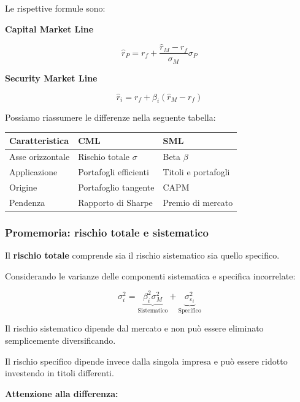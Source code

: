 \noindent Le rispettive formule sono:

\medskip

\noindent \textbf{Capital Market Line}

\[
\boxed{
\hat{r}_P=
r_f+\frac{\hat{r}_M-r_f}{\sigma_M}\sigma_P
}
\]

\noindent \textbf{Security Market Line}

\[
\boxed{
\hat{r}_i=
r_f+\beta_i(\hat{r}_M-r_f)
}
\]

\noindent Possiamo riassumere le differenze
nella seguente tabella:

\begin{center}
\small
\begin{tabular}{|l|l|l|}
\hline
\textbf{Caratteristica} &
\textbf{CML} &
\textbf{SML} \\
\hline
Asse orizzontale & Rischio totale $\sigma$ & Beta $\beta$ \\
\hline
Applicazione & Portafogli efficienti & Titoli e portafogli \\
\hline
Origine & Portafoglio tangente & CAPM \\
\hline
Pendenza & Rapporto di Sharpe & Premio di mercato \\
\hline
\end{tabular}
\end{center}

\subsubsection*{Promemoria: rischio totale e sistematico}

\noindent Il \textbf{rischio totale} comprende
sia il rischio sistematico sia quello specifico.

\medskip

\noindent Considerando le varianze delle componenti
sistematica e specifica incorrelate:

\[
\boxed{
\sigma_i^2=
\underbrace{\beta_i^2\sigma_M^2}_{\text{Sistematico}}
+
\underbrace{\sigma_{\varepsilon_i}^2}_{\text{Specifico}}
}
\]

\noindent Il rischio sistematico dipende dal mercato
e non può essere eliminato semplicemente
diversificando.

\medskip

\noindent Il rischio specifico dipende invece
dalla singola impresa e può essere ridotto
investendo in titoli differenti.

\medskip

\noindent \textbf{Attenzione alla differenza:}

